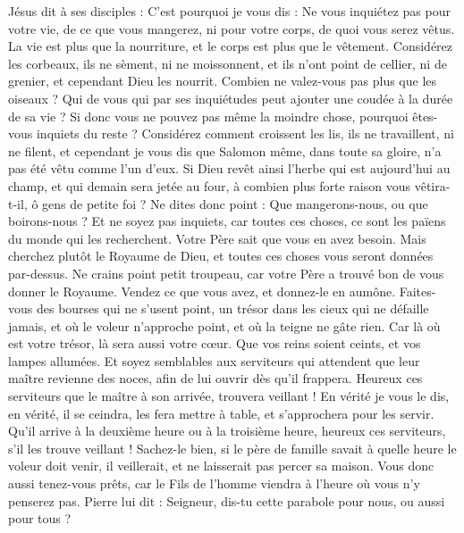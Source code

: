 \begin{multicols}{2}
Jésus dit à ses disciples : C’est pourquoi je vous dis : Ne vous inquiétez pas pour votre vie, de ce que vous mangerez, ni pour votre corps, de quoi vous serez vêtus.
La vie est plus que la nourriture, et le corps est plus que le vêtement.
Considérez les corbeaux, ils ne sèment, ni ne moissonnent, et ils n'ont point de cellier, ni de grenier, et cependant Dieu les nourrit. Combien ne valez-vous pas plus que les oiseaux ?
Qui de vous qui par ses inquiétudes peut ajouter une coudée à la durée de sa vie ?
Si donc vous ne pouvez pas même la moindre chose, pourquoi êtes-vous inquiets du reste ?
Considérez comment croissent les lis, ils ne travaillent, ni ne filent, et cependant je vous dis que Salomon même, dans toute sa gloire, n’a pas été vêtu comme l'un d'eux.
Si Dieu revêt ainsi l'herbe qui est aujourd'hui au champ, et qui demain sera jetée au four, à combien plus forte raison vous vêtira-t-il, ô gens de petite foi ?
Ne dites donc point : Que mangerons-nous, ou que boirons-nous ? Et ne soyez pas inquiets,
car toutes ces choses, ce sont les païens du monde qui les recherchent. Votre Père sait que vous en avez besoin.
Mais cherchez plutôt le Royaume de Dieu, et toutes ces choses vous seront données par-dessus.
Ne crains point petit troupeau, car votre Père a trouvé bon de vous donner le Royaume.
Vendez ce que vous avez, et donnez-le en aumône. Faites-vous des bourses qui ne s’usent point, un trésor dans les cieux qui ne défaille jamais, et où le voleur n'approche point, et où la teigne ne gâte rien.
Car là où est votre trésor, là sera aussi votre cœur.
Que vos reins soient ceints, et vos lampes allumées.
Et soyez semblables aux serviteurs qui attendent que leur maître revienne des noces, afin de lui ouvrir dès qu’il frappera.
Heureux ces serviteurs que le maître à son arrivée, trouvera veillant ! En vérité je vous le dis, en vérité, il se ceindra, les fera mettre à table, et s’approchera pour les servir.
Qu’il arrive à la deuxième heure ou à la troisième heure, heureux ces serviteurs, s’il les trouve veillant !
Sachez-le bien, si le père de famille savait à quelle heure le voleur doit venir, il veillerait, et ne laisserait pas percer sa maison.
Vous donc aussi tenez-vous prêts, car le Fils de l'homme viendra à l'heure où vous n'y penserez pas.
Pierre lui dit : Seigneur, dis-tu cette parabole pour nous, ou aussi pour tous ?

\end{multicols}

